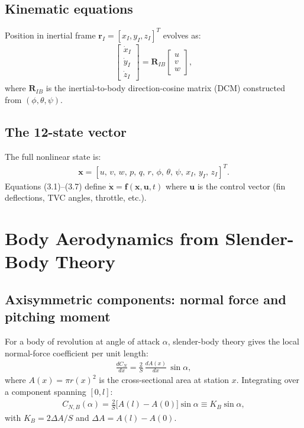 \documentclass[11pt]{article}
\begin{document}
\subsection{Kinematic equations}
Position in inertial frame $\mathbf{r}_I=[x_I,y_I,z_I]^T$ evolves as:
\begin{align}
\begin{bmatrix}\dot x_I\\\dot y_I\\\dot z_I\end{bmatrix}
= \mathbf{R}_{IB}
\begin{bmatrix}u\\v\\w\end{bmatrix},
\end{align}
where $\mathbf{R}_{IB}$ is the inertial-to-body direction-cosine matrix (DCM) constructed from $(\phi,\theta,\psi)$.

\subsection{The 12-state vector}
The full nonlinear state is:
\begin{align}
\mathbf{x} = [u,\,v,\,w,\,p,\,q,\,r,\,\phi,\,\theta,\,\psi,\,x_I,\,y_I,\,z_I]^T.
\end{align}
Equations (3.1)--(3.7) define $\dot{\mathbf{x}} = \mathbf{f}(\mathbf{x},\mathbf{u},t)$ where $\mathbf{u}$ is the control vector (fin deflections, TVC angles, throttle, etc.).

\section{Body Aerodynamics from Slender-Body Theory}

\subsection{Axisymmetric components: normal force and pitching moment}
For a body of revolution at angle of attack $\alpha$, slender-body theory gives the local normal-force coefficient per unit length:
\begin{align}
\frac{dC_N}{dx} = \frac{2}{S}\,\frac{dA(x)}{dx}\,\sin\alpha,
\end{align}
where $A(x)=\pi r(x)^2$ is the cross-sectional area at station $x$. Integrating over a component spanning $[0,l]$:
\begin{align}
C_{N,B}(\alpha) = \frac{2}{S}\big[A(l)-A(0)\big]\sin\alpha \equiv K_B\sin\alpha,
\end{align}
with $K_B = 2\Delta A/S$ and $\Delta A = A(l)-A(0)$.
\end{document}
